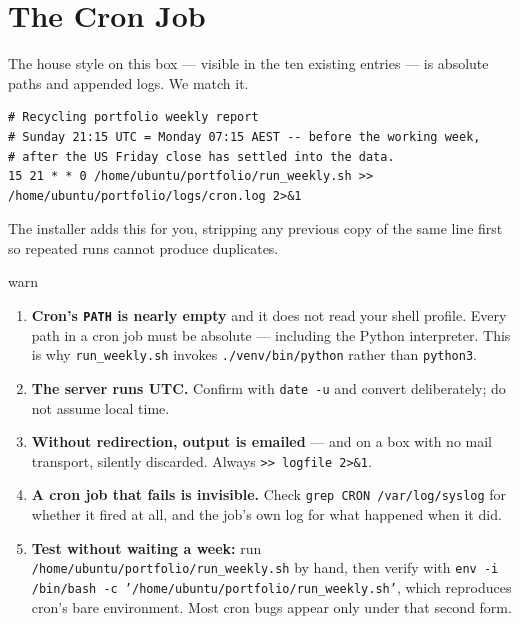 \documentclass[11pt,a4paper]{article}
\begin{document}
\section{The Cron Job}

The house style on this box --- visible in the ten existing entries ---
is absolute paths and appended logs. We match it.

\begin{codebox}[crontab -e]
\begin{lstlisting}[style=shell]
# Recycling portfolio weekly report
# Sunday 21:15 UTC = Monday 07:15 AEST -- before the working week,
# after the US Friday close has settled into the data.
15 21 * * 0 /home/ubuntu/portfolio/run_weekly.sh >> /home/ubuntu/portfolio/logs/cron.log 2>&1
\end{lstlisting}
\end{codebox}

The installer adds this for you, stripping any previous copy of the same
line first so repeated runs cannot produce duplicates.

\begin{resultbox}{warn}
\begin{enumerate}[leftmargin=1.5em, topsep=2pt]
    \item \textbf{Cron's \texttt{PATH} is nearly empty} and it does not
          read your shell profile. Every path in a cron job must be
          absolute --- including the Python interpreter. This is why
          \texttt{run\_weekly.sh} invokes
          \texttt{./venv/bin/python} rather than \texttt{python3}.
    \item \textbf{The server runs UTC.} Confirm with \texttt{date -u}
          and convert deliberately; do not assume local time.
    \item \textbf{Without redirection, output is emailed} --- and on a
          box with no mail transport, silently discarded. Always
          \texttt{>> logfile 2>\&1}.
    \item \textbf{A cron job that fails is invisible.} Check
          \texttt{grep CRON /var/log/syslog} for whether it fired at
          all, and the job's own log for what happened when it did.
    \item \textbf{Test without waiting a week:} run
          \texttt{/home/ubuntu/portfolio/run\_weekly.sh} by hand, then
          verify with \texttt{env -i /bin/bash -c
          '/home/ubuntu/portfolio/run\_weekly.sh'}, which reproduces
          cron's bare environment. Most cron bugs appear only under
          that second form.
\end{enumerate}
\end{resultbox}
\end{document}
